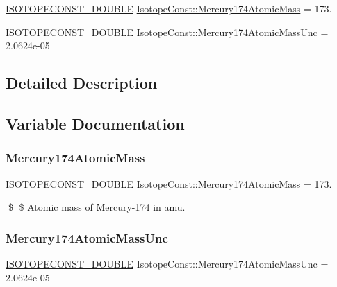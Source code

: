 \begin{DoxyCompactItemize}
\item 
\mbox{\hyperlink{group___isotope_const-_macros_ga8f45a7272ce02c0b4c65c44636ed719a}{I\+S\+O\+T\+O\+P\+E\+C\+O\+N\+S\+T\+\_\+\+D\+O\+U\+B\+LE}} \mbox{\hyperlink{group___isotope_const-_mercury-_hg174_ga933c2d8686c7be98cc318d317bdc518f}{Isotope\+Const\+::\+Mercury174\+Atomic\+Mass}} = 173.
\item 
\mbox{\hyperlink{group___isotope_const-_macros_ga8f45a7272ce02c0b4c65c44636ed719a}{I\+S\+O\+T\+O\+P\+E\+C\+O\+N\+S\+T\+\_\+\+D\+O\+U\+B\+LE}} \mbox{\hyperlink{group___isotope_const-_mercury-_hg174_ga60e4f0415070d609d426b331ebb4aa53}{Isotope\+Const\+::\+Mercury174\+Atomic\+Mass\+Unc}} = 2.\+0624e-\/05
\end{DoxyCompactItemize}


\subsection{Detailed Description}


\subsection{Variable Documentation}
\mbox{\label{group___isotope_const-_mercury-_hg174_ga933c2d8686c7be98cc318d317bdc518f}} 
\subsubsection{\texorpdfstring{Mercury174\+Atomic\+Mass}{Mercury174AtomicMass}}
{\footnotesize\ttfamily \mbox{\hyperlink{group___isotope_const-_macros_ga8f45a7272ce02c0b4c65c44636ed719a}{I\+S\+O\+T\+O\+P\+E\+C\+O\+N\+S\+T\+\_\+\+D\+O\+U\+B\+LE}} Isotope\+Const\+::\+Mercury174\+Atomic\+Mass = 173.}

\$ \$ Atomic mass of Mercury-\/174 in amu. \mbox{\label{group___isotope_const-_mercury-_hg174_ga60e4f0415070d609d426b331ebb4aa53}} 
\subsubsection{\texorpdfstring{Mercury174\+Atomic\+Mass\+Unc}{Mercury174AtomicMassUnc}}
{\footnotesize\ttfamily \mbox{\hyperlink{group___isotope_const-_macros_ga8f45a7272ce02c0b4c65c44636ed719a}{I\+S\+O\+T\+O\+P\+E\+C\+O\+N\+S\+T\+\_\+\+D\+O\+U\+B\+LE}} Isotope\+Const\+::\+Mercury174\+Atomic\+Mass\+Unc = 2.\+0624e-\/05}

